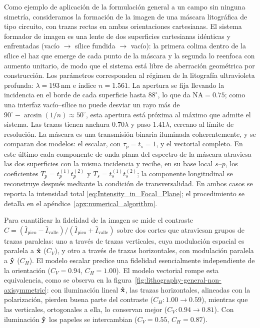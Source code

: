 Como ejemplo de aplicación de la formulación general a un campo sin ninguna
simetría, consideramos la formación de la imagen de una máscara litográfica de
tipo circuito, con trazas rectas en ambas orientaciones cartesianas. El sistema
formador de imagen es una lente de dos superficies cartesianas idénticas y
enfrentadas (vacío $\to$ sílice fundida $\to$ vacío): la primera colima dentro
de la sílice el haz que emerge de cada punto de la máscara y la segunda lo
reenfoca con aumento unitario, de modo que el sistema está libre de
aberración geométrica por construcción. Los parámetros corresponden al régimen
de la litografía ultravioleta profunda: $\lambda=193\,\mathrm{nm}$ e índice
$n=1.561$. La apertura se fija llevando la incidencia en el borde de cada
superficie hasta $88^\circ$, lo que da $\mathrm{NA}=0.75$; como una interfaz
vacío--sílice no puede desviar un rayo más de
$90^\circ-\arcsin(1/n)\approx 50^\circ$, esta apertura está próxima al máximo
que admite el sistema. Las trazas tienen anchura $0.70\lambda$ y paso
$1.41\lambda$, cercano al límite de resolución. La máscara es una transmisión
binaria iluminada coherentemente, y se comparan dos modelos: el escalar, con
$\tau_p=t_s=1$, y el vectorial completo. En este último cada componente de
onda plana del espectro de la máscara atraviesa las dos superficies con la
misma incidencia y recibe, en su base local $s$--$p$, los coeficientes
$T_p=t_p^{(1)}t_p^{(2)}$ y $T_s=t_s^{(1)}t_s^{(2)}$; la componente
longitudinal se reconstruye después mediante la condición de
transversalidad. En ambos casos se reporta la intensidad total
\eqref{eq:Intensity_in_Focal_Plane}; el procedimiento se detalla en el
apéndice~\ref{apx:numerical_algorithm}.

Para cuantificar la fidelidad de la imagen se mide el contraste
$C=(\bar I_{\mathrm{pico}}-\bar I_{\mathrm{valle}})/(\bar
I_{\mathrm{pico}}+\bar I_{\mathrm{valle}})$ sobre dos cortes que atraviesan
grupos de trazas paralelas: uno a través de trazas verticales, cuya
modulación espacial es paralela a $\bm{\hat{\mathbf{x}}}$ ($C_V$), y otro a través de
trazas horizontales, con modulación paralela a $\bm{\hat{\mathbf{y}}}$ ($C_H$). El modelo
escalar predice una fidelidad esencialmente independiente de la orientación
($C_V=0.94$, $C_H=1.00$). El modelo vectorial rompe esta equivalencia, como
se observa en la figura~\ref{fig:lithography-general-non-axisymmetric}: con
iluminación lineal $\bm{\hat{\mathbf{x}}}$, las trazas horizontales, alineadas con la
polarización, pierden buena parte del contraste ($C_H: 1.00\to 0.59$),
mientras que las verticales, ortogonales a ella, lo conservan mejor
($C_V: 0.94\to 0.81$). Con iluminación $\bm{\hat{\mathbf{y}}}$ los papeles se
intercambian ($C_V=0.55$, $C_H=0.87$).


